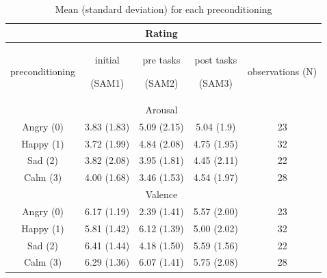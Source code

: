 	\begin{table}[h!]
	\begin{center}
				
		\begin{tabular}{|c|c|c|c|c|}
			\hline 
			& \multicolumn{3}{c|}{Rating} &  \\ 
			\hline 
			preconditioning & 
			\pbox{30cm}{initial \\ 
				\begin{footnotesize}
					(SAM1)
				\end{footnotesize}} & 
			\pbox{30cm}{pre tasks \\ 
				\begin{footnotesize}
					(SAM2)
				\end{footnotesize}} & 
			\pbox{30cm}{post tasks \\ 
				\begin{footnotesize}
					(SAM3)
				\end{footnotesize}}  & 
			observations (N) \rule[-2ex]{0pt}{7ex} \\ [2ex]
			\hline 
			& \multicolumn{3}{|c|}{Arousal} &  \\ 
			\hline 
			Angry (0) & 3.83 (1.83) & 5.09 (2.15) & 5.04 (1.9) & 23 \\ 
			\hline 
			Happy (1) & 3.72 (1.99) & 4.84 (2.08) & 4.75 (1.95) & 32 \\ 
			\hline 
			Sad (2) & 3.82 (2.08) & 3.95 (1.81) & 4.45 (2.11) & 22 \\ 
			\hline 
			Calm (3) & 4.00 (1.68) & 3.46 (1.53) & 4.54 (1.97) & 28 \\ 
			\hline 
			& \multicolumn{3}{|c|}{Valence} &  \\ 
			\hline 
			Angry (0) & 6.17 (1.19) & 2.39 (1.41) & 5.57 (2.00) & 23 \\ 
			\hline 
			Happy (1) & 5.81 (1.42) & 6.12 (1.39) & 5.00 (2.02) & 32 \\ 
			\hline 
			Sad (2) & 6.41 (1.44) & 4.18 (1.50) & 5.59 (1.56) & 22 \\ 
			\hline 
			Calm (3) & 6.29 (1.36) & 6.07 (1.41) & 5.75 (2.08) & 28 \\ 
			\hline 
		\end{tabular}
	\end{center}
	\caption{Mean (standard deviation) for each preconditioning}
	\label{tbl:distributionOfAffect}
	\end{table}

%	

